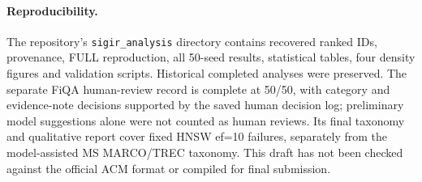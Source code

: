 \documentclass[10pt,twocolumn]{article}
\begin{document}
\paragraph{Reproducibility.} The repository's \texttt{sigir\_analysis} directory contains recovered ranked IDs, provenance, FULL reproduction, all 50-seed results, statistical tables, four density figures and validation scripts. Historical completed analyses were preserved. The separate FiQA human-review record is complete at 50/50, with category and evidence-note decisions supported by the saved human decision log; preliminary model suggestions alone were not counted as human reviews. Its final taxonomy and qualitative report cover fixed HNSW ef=10 failures, separately from the model-assisted MS MARCO/TREC taxonomy. This draft has not been checked against the official ACM format or compiled for final submission.
\end{document}
